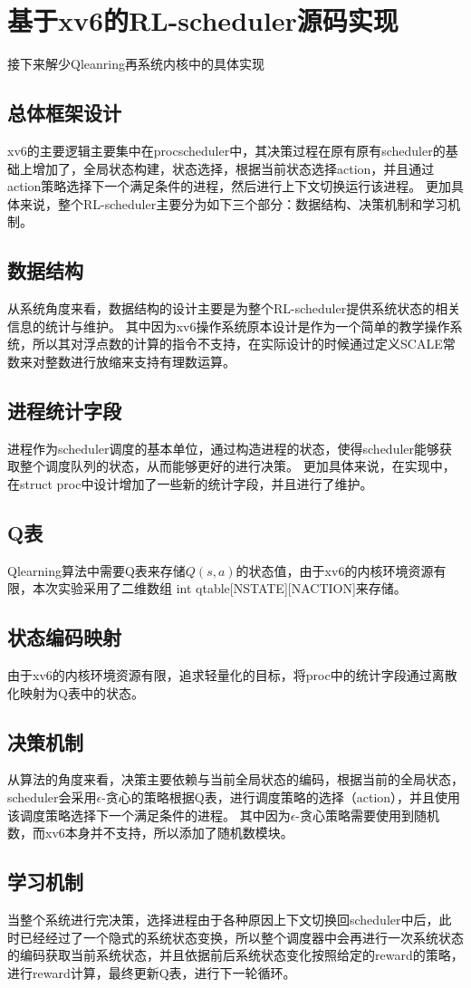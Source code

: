 \section{基于xv6的RL-scheduler源码实现}
接下来解少Qleanring再系统内核中的具体实现
\subsection{总体框架设计}
xv6的主要逻辑主要集中在procscheduler中，其决策过程在原有原有scheduler的基础上增加了，全局状态构建，状态选择，根据当前状态选择action，并且通过action策略选择下一个满足条件的进程，然后进行上下文切换运行该进程。
更加具体来说，整个RL-scheduler主要分为如下三个部分：数据结构、决策机制和学习机制。

\subsection{数据结构}
从系统角度来看，数据结构的设计主要是为整个RL-scheduler提供系统状态的相关信息的统计与维护。
其中因为xv6操作系统原本设计是作为一个简单的教学操作系统，所以其对浮点数的计算的指令不支持，在实际设计的时候通过定义SCALE常数来对整数进行放缩来支持有理数运算。
\subsection{进程统计字段}
进程作为scheduler调度的基本单位，通过构造进程的状态，使得scheduler能够获取整个调度队列的状态，从而能够更好的进行决策。
更加具体来说，在实现中，在struct proc中设计增加了一些新的统计字段，并且进行了维护。
\subsection{Q表}
Qlearning算法中需要Q表来存储$Q(s,a)$的状态值，由于xv6的内核环境资源有限，本次实验采用了二维数组
int qtable[NSTATE][NACTION]来存储。
\subsection{状态编码映射}
由于xv6的内核环境资源有限，追求轻量化的目标，将proc中的统计字段通过离散化映射为Q表中的状态。
\subsection{决策机制}
从算法的角度来看，决策主要依赖与当前全局状态的编码，根据当前的全局状态，scheduler会采用$\epsilon$-贪心的策略根据Q表，进行调度策略的选择（action），并且使用该调度策略选择下一个满足条件的进程。
其中因为$\epsilon$-贪心策略需要使用到随机数，而xv6本身并不支持，所以添加了随机数模块。
\subsection{学习机制}
当整个系统进行完决策，选择进程由于各种原因上下文切换回scheduler中后，此时已经经过了一个隐式的系统状态变换，所以整个调度器中会再进行一次系统状态的编码获取当前系统状态，并且依据前后系统状态变化按照给定的reward的策略，进行reward计算，最终更新Q表，进行下一轮循环。
